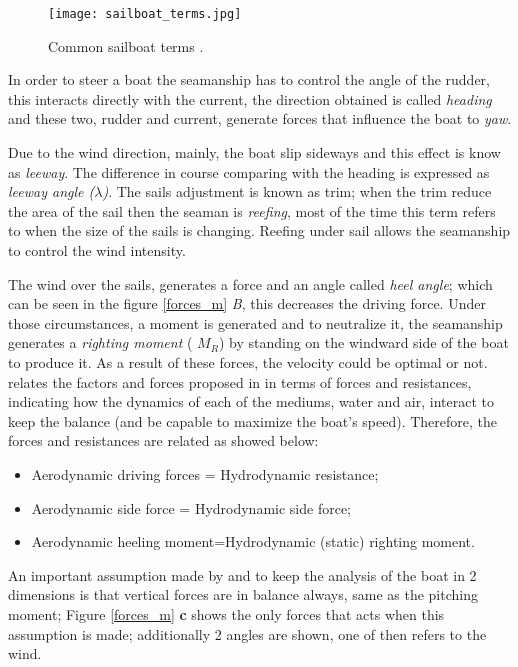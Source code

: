  \begin{figure}%
\centering
  \texttt{[image: sailboat\_terms.jpg]}
 \caption{Common sailboat terms \cite{sailboat_terms}. }
\label{sailboat_terms}
\end{figure}
In order to steer a boat the seamanship has to control the angle of the rudder, this interacts directly with the current, the direction obtained is called \textit{heading} and these two, rudder and current, generate forces that influence the boat to \textit{yaw}. \par
Due to the wind direction, mainly, the boat slip sideways and this effect is know as \textit{leeway}. The difference in course comparing with the heading is expressed as \textit{leeway angle ($\lambda$)}. %
The sails adjustment is known as trim; when the trim reduce the area of the sail then the seaman is \textit{reefing}, most of the time this term refers to when the size of the sails is changing.  Reefing under sail allows the seamanship to control the wind intensity. \par
The wind over the sails, generates a force and an angle called \textit{heel angle}; which can be seen in the figure \ref{forces_m} \textit{B}, this decreases the driving force. Under those circumstances, a moment is generated and to neutralize it, the seamanship generates a \textit{righting moment} (\textit{ $M_{R}$}) by standing on the windward side of the boat to produce it\cite{philpott1993yacht}. 
As a result of these forces, the velocity could be optimal or not. \cite{larsonprinciples} relates the factors and forces proposed in\cite{philpott1993yacht} in terms of forces and resistances, indicating how the dynamics of each of the mediums, water and air, interact to keep the balance (and be capable to maximize the boat's speed). Therefore, the forces and resistances are related as showed below: \par 
\begin{itemize}  \label{milgramforces}
 \setlength \itemsep{0em}
\item Aerodynamic driving forces = Hydrodynamic resistance;
\item Aerodynamic side force = Hydrodynamic side force;
\item Aerodynamic heeling moment=Hydrodynamic (static) righting moment.
\end{itemize}
An important assumption made by  \cite{philpott1993yacht} and \cite{larsonprinciples} to keep the analysis of the boat in 2 dimensions is that vertical forces are in balance always, same as the pitching moment; Figure \ref{forces_m} \textbf{c} shows the only forces that acts when this assumption is made; additionally 2 angles are shown, one of then refers to the wind.\par

